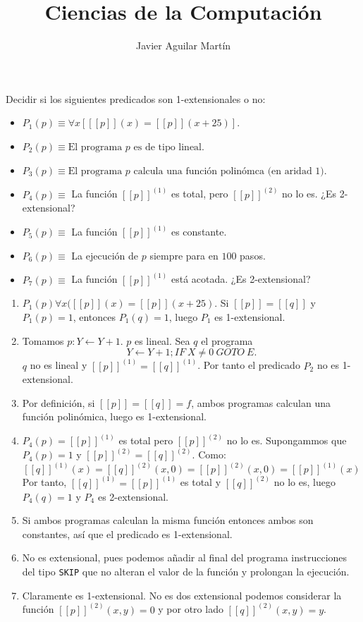 \documentclass[twoside]{article}
\begin{document}
\title{Ciencias de la Computación}

\author{Javier Aguilar Martín}
\maketitle

\begin{ejercicio}{1}
Decidir si los siguientes predicados son 1-extensionales o no:
\begin{itemize}
	\item $P_1(p) \equiv \forall x [[\![p]\!](x) = [[p]](x+25)]$.
	\item $P_2(p) \equiv \text{El programa }p\text{ es de tipo lineal}$.
	\item $P_3(p) \equiv \text{El programa }p\text{ calcula una función polinómca (en aridad 1)}$.
	\item $P_4(p) \equiv$ La función $[[p]]^{(1)}$ es total, pero $[[p]]^{(2)}$ no lo es. ¿Es 2-extensional?
	\item $P_5(p) \equiv$ La función $[[p]]^{(1)}$ es constante.
	\item $P_6(p) \equiv$ La ejecución de $p$ siempre para en $100$ pasos.
	\item $P_7(p) \equiv$ La función $[[p]]^{(1)}$ está acotada. ¿Es 2-extensional?
\end{itemize}
\end{ejercicio}
\begin{solucion}
\end{solucion}
\begin{enumerate}
	\item $P_1(p)  \forall x ( [[p]](x) = [[p]](x+25)$. Si $[[p]]=[[q]]$ y $P_1(p) = 1$, entonces $P_1(q) = 1$, luego $P_1$ es 1-extensional.
	
	\item Tomamos $p : Y \leftarrow Y+1$. $p$ es lineal. Sea $q$ el programa $$Y \leftarrow Y+1; IF\ X \neq 0\ GOTO\ E.$$ $q$ no es lineal y $[[p]]^{(1)} = [[q]]^{(1)}$. Por tanto el predicado $P_2$ no es 1-extensional.
	
	\item Por definición, si $[[p]]=[[q]]=f$, ambos programas calculan una función polinómica, luego es 1-extensional.
	\item $P_4(p) = [[p]]^{(1)}$ es total pero $[[p]]^{(2)}$ no lo es. Supongammos que $P_4(p) = 1$ y $[[p]]^{(2)} = [[q]]^{(2)}$. Como:
	\[ [[q]]^{(1)}(x) = [[q]]^{(2)}(x,0) = [[p]]^{(2)}(x,0) = [[p]]^{(1)}(x) \]
	Por tanto, $[[q]]^{(1)} = [[p]]^{(1)}$ es total y $[[q]]^{(2)}$ no lo es, luego $P_4(q) = 1$ y $P_4$ es 2-extensional.
	\item Si ambos programas calculan la misma función entonces ambos son constantes, así que el predicado es 1-extensional.
	\item No es extensional, pues podemos añadir al final del programa instrucciones del tipo \texttt{SKIP} que no alteran el valor de la función y prolongan la ejecución. 
	\item Claramente es 1-extensional. No es dos extensional podemos considerar la función $[[p]]^{(2)}(x,y)=0$ y por otro lado $[[q]]^{(2)}(x,y)=y$.
\end{enumerate}
\end{document}
